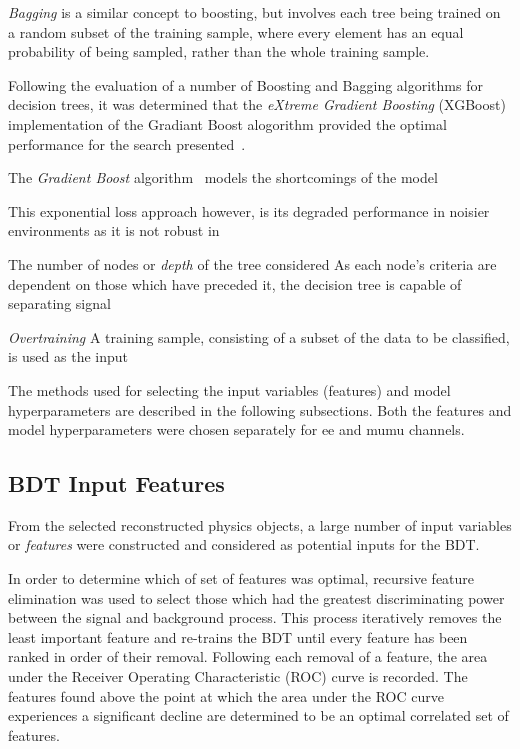 \emph{Bagging} is a similar concept to boosting, but involves each tree being trained on a random subset of the training sample, where every element has an equal probability of being sampled, rather than the whole training sample.

Following the evaluation of a number of Boosting and Bagging algorithms for decision trees, it was determined that the
\emph{eXtreme Gradient Boosting} (XGBoost) implementation of the Gradiant Boost alogorithm provided the optimal performance for the search presented~\cite{xgboost}.

The \emph{Gradient Boost} algorithm~\cite{Friedman:GradientBoosting} models the shortcomings of the model 


This exponential loss approach however, is its degraded performance in noisier environments as it is not robust in 	

The number of nodes or \emph{depth} of the tree considered
As each node's criteria are dependent on those which have preceded it, the decision tree is capable of separating signal 

\emph{Overtraining}
A training sample, consisting of a subset of the data to be classified, is used as the input 




The methods used for selecting the input variables (features) and model hyperparameters are described in the following subsections.
Both the features and model hyperparameters were chosen separately for ee and mumu channels.

\subsection{BDT Input Features}
From the selected reconstructed physics objects, a large number of input variables or \emph{features} were constructed and considered as potential inputs for the BDT.

In order to determine which of set of features was optimal, recursive feature elimination was used to select those which had the greatest discriminating power between the signal and background process.
This process iteratively removes the least important feature and re-trains the BDT until every feature has been ranked in order of their removal.
Following each removal of a feature, the area under the Receiver Operating Characteristic (ROC) curve is recorded.
The features found above the point at which the area under the ROC curve experiences a significant decline are determined to be an optimal correlated set of features.
 
